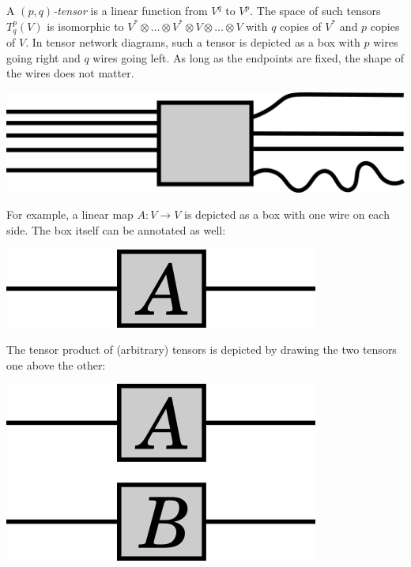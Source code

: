 A $(p, q)$\textit{-tensor} is a linear function from $V^q$ to $V^p$. The space of such tensors $T^p_q (V)$ is isomorphic to $V^* \otimes ... \otimes V^* \otimes V \otimes ... \otimes V$ with $q$ copies of $V^*$ and $p$ copies of $V$. In tensor network diagrams, such a tensor is depicted as a box with $p$ wires going right and $q$ wires going left. As long as the endpoints are fixed, the shape of the wires does not matter.

\begin{center}
    \includegraphics{figures/inkscape/tensor_box}
\end{center}

For example, a linear map $A: V \rightarrow V$ is depicted as a box with one wire on each side. The box itself can be annotated as well:

\begin{center}
    \includegraphics{figures/inkscape/box_a.png}
\end{center}

The tensor product of (arbitrary) tensors is depicted by drawing the two tensors one above the other:

\begin{center}
    \includegraphics{figures/inkscape/tensor_product.png}
\end{center}


